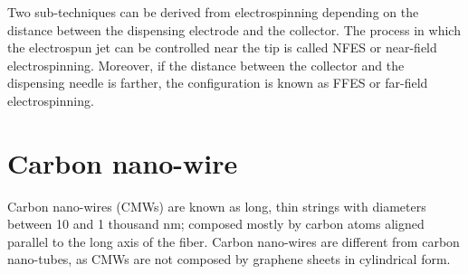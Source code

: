 \cite{Nataraj2012}

Two sub-techniques can be derived from electrospinning depending on the distance between the dispensing electrode and the collector. The process in which the electrospun jet can be controlled near the tip is called NFES or near-field electrospinning. \cite{Cisquella-Serra2019} Moreover, if the distance between the collector and the dispensing needle is farther, the configuration is known as FFES or far-field electrospinning. \cite{Nataraj2012}

\section{Carbon nano-wire}
Carbon nano-wires (CMWs) are known as long, thin strings with diameters between 10 and 1 thousand nm; composed mostly by carbon atoms aligned parallel to the long axis of the fiber. \cite{Nataraj2012} Carbon nano-wires are different from carbon nano-tubes, as CMWs are not composed by graphene sheets in cylindrical form. \cite{Nataraj2012}






